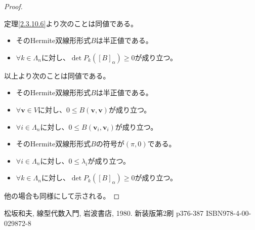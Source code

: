 \documentclass[dvipdfmx]{jsarticle}
\begin{document}
\begin{proof}
\begin{itemize}
\end{itemize}
定理\ref{2.3.10.6}より次のことは同値である。
\begin{itemize}
\item
  そのHermite双線形形式$B$は半正値である。
\item
  $\forall k \in \varLambda_{n}$に対し、$\det{P_{k}\left( [ B]_{\alpha} \right)} \geq 0$が成り立つ。
\end{itemize}
以上より次のことは同値である。
\begin{itemize}
\item
  そのHermite双線形形式$B$は半正値である。
\item
  $\forall\mathbf{v} \in V$に対し、$0 \leq B\left( \mathbf{v},\mathbf{v} \right)$が成り立つ。
\item
  $\forall i \in \varLambda_{n}$に対し、$0 \leq B\left( \mathbf{v}_{i},\mathbf{v}_{i} \right)$が成り立つ。
\item
  そのHermite双線形形式$B$の符号が$(\pi,0)$である。
\item
  $\forall i \in \varLambda_{n}$に対し、$0 \leq \lambda_{i}$が成り立つ。
\item
  $\forall k \in \varLambda_{n}$に対し、$\det{P_{k}\left( [ B]_{\alpha} \right)} \geq 0$が成り立つ。
\end{itemize}
他の場合も同様にして示される。
\end{proof}
\begin{thebibliography}{50}
    松坂和夫, 線型代数入門, 岩波書店, 1980. 新装版第2刷 p376-387 ISBN978-4-00-029872-8
\end{thebibliography}
\end{document}
